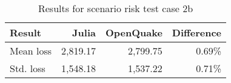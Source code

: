 \begin{table}[htbp]

\centering
\begin{tabular}{ l r r r }

\hline
\rowcolor{anti-flashwhite}
\bf{Result} & \bf{Julia} & \bf{OpenQuake} & \bf{Difference}\\
\hline
Mean loss & 2,819.17 & 2,799.75 & 0.69\% \\
Std. loss & 1,548.18 & 1,537.22 & 0.71\% \\
\hline
\end{tabular}

\caption{Results for scenario risk test case 2b}
\label{tab:result-sr-2b}
\end{table}
